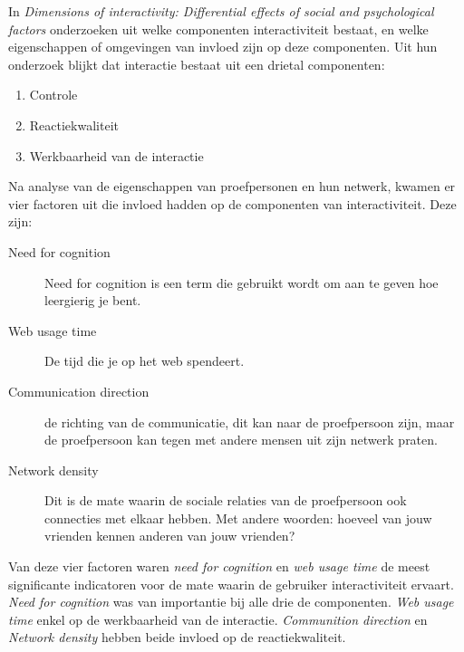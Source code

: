 \documentclass[a4paper, 10pt, pdftex]{report}
\begin{document}
      In \emph{Dimensions of interactivity: Differential effects of social and psychological factors} onderzoeken \citeauthor{Sohn2005} uit welke componenten interactiviteit bestaat, en welke eigenschappen of omgevingen van invloed zijn op deze componenten. Uit hun onderzoek blijkt dat interactie bestaat uit een drietal componenten:
        \begin{enumerate}
          \item Controle
          \item Reactiekwaliteit
          \item Werkbaarheid van de interactie
        \end{enumerate}
      Na analyse van de eigenschappen van proefpersonen en hun netwerk, kwamen er vier factoren uit die invloed hadden op de componenten van interactiviteit. Deze zijn:
        \begin{description}
          \item[Need for cognition]
            Need for cognition is een term die gebruikt wordt om aan te geven hoe leergierig je bent.
          \item[Web usage time]
            De tijd die je op het web spendeert.
          \item[Communication direction]
            de richting van de communicatie, dit kan naar de proefpersoon zijn, maar de proefpersoon kan tegen met andere mensen uit zijn netwerk praten.
          \item[Network density]
            Dit is de mate waarin de sociale relaties van de proefpersoon ook connecties met elkaar hebben. Met andere woorden: hoeveel van jouw vrienden kennen anderen van jouw vrienden?
        \end{description}
        Van deze vier factoren waren \emph{need for cognition} en \emph{web usage time} de meest significante indicatoren voor de mate waarin de gebruiker interactiviteit ervaart. \emph{Need for cognition} was van importantie bij alle drie de componenten. \emph{Web usage time} enkel op de werkbaarheid van de interactie. \emph{Communition direction} en \emph{Network density} hebben beide invloed op de reactiekwaliteit.
\end{document}

